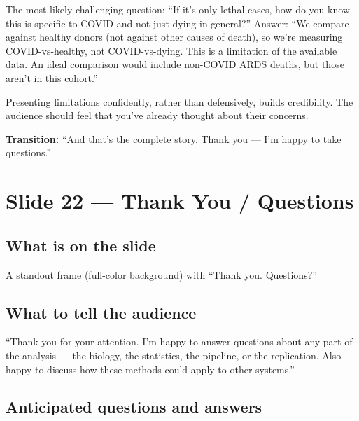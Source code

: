 \documentclass[11pt]{article}
\begin{document}
\begin{pitfall}
The most likely challenging question: ``If it's only lethal cases, how do you know this is specific to COVID and not just dying in general?'' Answer: ``We compare against healthy donors (not against other causes of death), so we're measuring COVID-vs-healthy, not COVID-vs-dying. This is a limitation of the available data. An ideal comparison would include non-COVID ARDS deaths, but those aren't in this cohort.''
\end{pitfall}

\begin{resultbox}
Presenting limitations confidently, rather than defensively, builds credibility. The audience should feel that you've already thought about their concerns.
\end{resultbox}

\textbf{Transition:} ``And that's the complete story. Thank you --- I'm happy to take questions.''


\section{Slide 22 --- Thank You / Questions}

\subsection{What is on the slide}

A standout frame (full-color background) with ``Thank you. Questions?''

\subsection{What to tell the audience}

\begin{speaknote}
``Thank you for your attention. I'm happy to answer questions about any part of the analysis --- the biology, the statistics, the pipeline, or the replication. Also happy to discuss how these methods could apply to other systems.''
\end{speaknote}

\subsection{Anticipated questions and answers}
\end{document}
